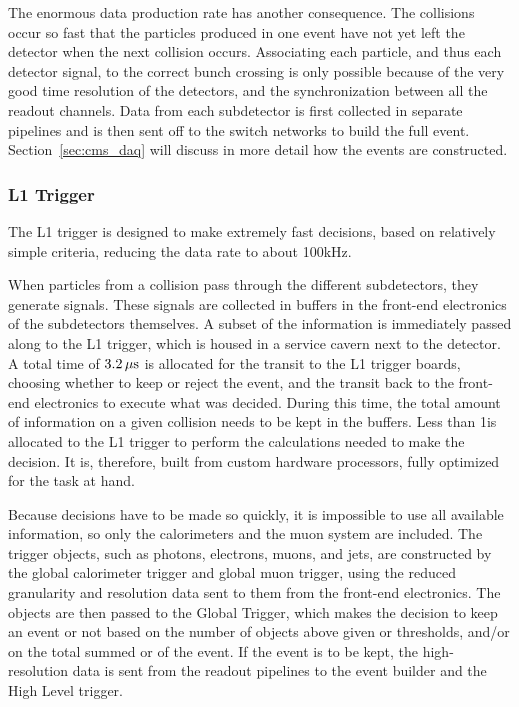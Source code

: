 The enormous data production rate has another consequence. The collisions occur so fast that the
particles produced in one event have not yet left the detector when the next collision occurs. 
Associating each particle, and thus each detector signal, to the correct bunch crossing is only
possible because of the very good time resolution of the detectors, and the synchronization between
all the readout channels. 
Data from each subdetector is first collected in separate pipelines and is then sent off to the
switch networks to build the full event. Section~\ref{sec:cms_daq} will discuss in more detail how
the events are constructed.

\subsubsection{L1 Trigger \label{sec:cms_level_one}}

The L1 trigger is designed to make extremely fast decisions, based on relatively simple criteria,
reducing the data rate to about 100\unit{kHz}. 

When particles from a collision pass through the different subdetectors, they generate signals.
These signals are collected in buffers in the front-end electronics of the subdetectors themselves. 
A subset of the information is immediately passed along to the L1 trigger, which is housed
in a service cavern next to the detector. A total time of $3.2\,\mu\text{s}$ is allocated for the transit to
the L1 trigger boards, choosing whether to keep or reject the event, and the transit back to the
front-end electronics to execute what was decided. During this time, the total amount of information
on a given collision needs to be kept in the buffers.
Less than 1\mus is allocated to the L1 trigger to perform the calculations needed to make the
decision. It is, therefore, built from custom hardware processors, fully optimized for the task at
hand. 

Because decisions have to be made so quickly, it is impossible to use all available information, so
 only the calorimeters and the muon system are included. 
The trigger objects, such as photons, electrons, muons, and jets, are constructed by the global
calorimeter trigger and global muon trigger, using the reduced granularity and resolution data
sent to them from the front-end electronics. The objects are then passed to the Global Trigger,
which makes the decision to keep an event or not based on the number of objects above given \ET
or \pt thresholds, and/or on the total summed \ET or \ETm of the event. If the event is to be kept,
the high-resolution data is sent from the readout pipelines to the event builder and the High
Level trigger. 

